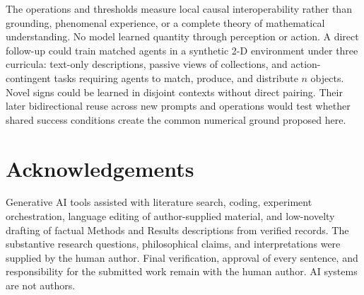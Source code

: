 \documentclass[11pt]{article}
\begin{document}
The operations and thresholds measure local causal interoperability rather
than grounding, phenomenal experience, or a complete theory of mathematical
understanding. No model learned quantity through perception or action. A
direct follow-up could train matched agents in a synthetic 2-D environment
under three curricula: text-only descriptions, passive views of collections,
and action-contingent tasks requiring agents to match, produce, and distribute
$n$ objects. Novel signs could be learned in disjoint contexts without direct
pairing. Their later bidirectional reuse across new prompts and operations
would test whether shared success conditions create the common numerical
ground proposed here.

\section*{Acknowledgements}


Generative AI tools assisted with literature search, coding, experiment
orchestration, language editing of author-supplied material, and low-novelty
drafting of factual Methods and Results descriptions from verified records.
The substantive research questions, philosophical claims, and interpretations
were supplied by the human author. Final verification, approval of every
sentence, and responsibility for the submitted work remain with the human
author. AI systems are not authors.


\end{document}
